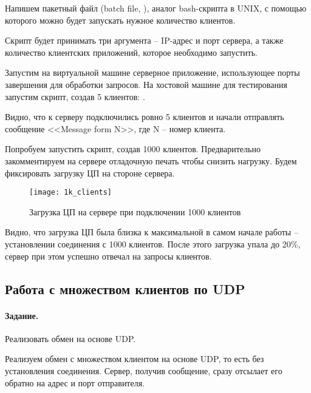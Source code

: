 

Напишем пакетный файл (batch file, ), аналог bash-скрипта в UNIX, с помощью которого можно будет запускать нужное количество клиентов.



Скрипт будет принимать три аргумента -- IP-адрес и порт сервера, а также количество клиентских приложений, которое необходимо запустить.

Запустим на виртуальной машине серверное приложение, использующее порты завершения для обработки запросов. На хостовой машине для тестирования запустим скрипт, создав 5 клиентов: .



Видно, что к серверу подключились ровно 5 клиентов и начали отправлять сообщение <<Message form N>>, где N -- номер клиента.

Попробуем запустить скрипт, создав 1000 клиентов. Предварительно закомментируем на сервере отладочную печать чтобы снизить нагрузку. Будем фиксировать загрузку ЦП на стороне сервера.

\begin{figure}[H]
	\centering
	\texttt{[image: 1k\_clients]}
	\caption{Загрузка ЦП на сервере при подключении 1000 клиентов}
\end{figure}

Видно, что загрузка ЦП была близка к максимальной в самом начале работы -- установлении соединения с 1000 клиентов. После этого загрузка упала до 20\%, сервер при этом успешно отвечал на запросы клиентов.

\subsection{Работа с множеством клиентов по UDP}

\paragraph{Задание.} Реализовать обмен на основе UDP.

Реализуем обмен с множеством клиентом на основе UDP, то есть без установления соединения. Сервер, получив сообщение, сразу отсылает его обратно на адрес и порт отправителя.

